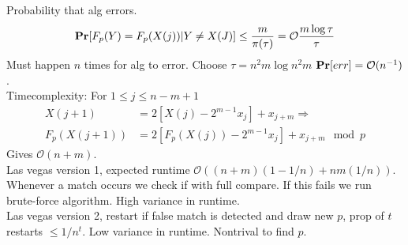 \documentclass[a4paper]{article}
\def\Pr{\mbox{\textbf{Pr}}}
\begin{document}
Probability that alg errors.
\[\Pr[F_p(Y)=F_p(X(j)) | Y \neq X(J)] \leq \frac {m}{\pi(\tau)} = \mathcal{O}\frac{m \log \tau}{\tau}\]
Must happen \(n\) times for alg to error. Choose \(\tau=n^2m\log n^2m \) \(\Pr[err] = \mathcal{O}(n^{-1})\).\\
Timecomplexity: For \(1\leq j \leq n-m+1\) 
\begin{align*}
X(j+1) &= 2 [X(j)-2^{m-1}x_j]+x_{j+m} \Rightarrow\\
F_p(X(j+1)) &= 2 [F_p(X(j))-2^{m-1}x_j] + x_{j+m} \mod p
\end{align*}
Gives \(\mathcal{O}(n+m)\).\\
Las vegas version 1, expected runtime \(\mathcal{O}((n+m)(1-1/n) + nm(1/n))\). Whenever a match occurs we check if with full compare. If this fails we run brute-force algorithm. High variance in runtime.\\
Las vegas version 2, restart if false match is detected and draw new \(p\), prop of \(t\) restarts \(\leq 1/n^t\). Low variance in runtime. Nontrival to find \(p\).
\end{document}
